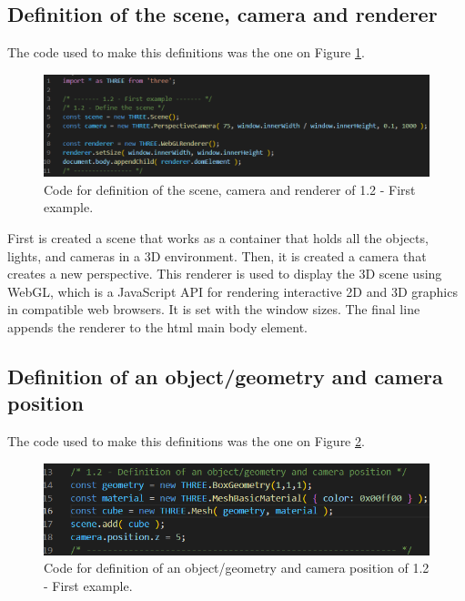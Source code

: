 \documentclass[12pt]{article}
\begin{document}
\subsection{Definition of the scene, camera and renderer}

The code used to make this definitions was the one on Figure \ref{figs:ex12_1}.

\begin{figure}[h!]
    \centering
        \includegraphics[width = \textwidth]{figs/ex12_1.png}
        \caption{Code for definition of the scene, camera and renderer of 1.2 - First example.}
        \label{figs:ex12_1}
\end{figure}

First is created a scene that works as a container that holds all the objects, lights, and cameras in a 3D environment. Then, it is created a camera that creates a new perspective.\newline
This renderer is used to display the 3D scene using WebGL, which is a JavaScript API for rendering interactive 2D and 3D graphics in compatible web browsers. It is set with the window sizes.\newline
The final line appends the renderer to the html main body element.

\subsection{Definition of an object/geometry and camera position}

The code used to make this definitions was the one on Figure \ref{figs:ex12_2}.

\begin{figure}[h!]
    \centering
        \includegraphics[width = \textwidth]{figs/ex12_2.png}
        \caption{Code for definition of an object/geometry and camera position of 1.2 - First example.}
        \label{figs:ex12_2}
\end{figure}
\end{document}
